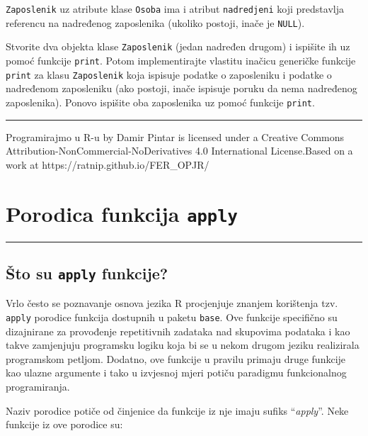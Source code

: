 \documentclass[]{book}
\theoremstyle{definition}
\theoremstyle{definition}
\theoremstyle{definition}
\theoremstyle{remark}
\begin{document}
\texttt{Zaposlenik} uz atribute klase \texttt{Osoba} ima i atribut
\texttt{nadredjeni} koji predstavlja referencu na nadređenog zaposlenika
(ukoliko postoji, inače je \texttt{NULL}).

Stvorite dva objekta klase \texttt{Zaposlenik} (jedan nadređen drugom) i
ispišite ih uz pomoć funkcije \texttt{print}. Potom implementirajte
vlastitu inačicu generičke funkcije \texttt{print} za klasu
\texttt{Zaposlenik} koja ispisuje podatke o zaposleniku i podatke o
nadređenom zaposleniku (ako postoji, inače ispisuje poruku da nema
nadređenog zaposlenika). Ponovo ispišite oba zaposlenika uz pomoć
funkcije \texttt{print}.

\begin{center}\rule{0.5\linewidth}{\linethickness}\end{center}

{Programirajmo u R-u} by Damir Pintar is licensed under a Creative
Commons Attribution-NonCommercial-NoDerivatives 4.0 International
License.Based on a work at https://ratnip.github.io/FER\_OPJR/

\chapter{\texorpdfstring{Porodica funkcija
\texttt{apply}}{Porodica funkcija apply}}\label{apply}

\begin{center}\rule{0.5\linewidth}{\linethickness}\end{center}

\section{\texorpdfstring{Što su \texttt{apply}
funkcije?}{Što su apply funkcije?}}\label{sto-su-apply-funkcije}

Vrlo često se poznavanje osnova jezika R procjenjuje znanjem korištenja
tzv. \texttt{apply} porodice funkcija dostupnih u paketu \texttt{base}.
Ove funkcije specifično su dizajnirane za provođenje repetitivnih
zadataka nad skupovima podataka i kao takve zamjenjuju programsku logiku
koja bi se u nekom drugom jeziku realizirala programskom petljom.
Dodatno, ove funkcije u pravilu primaju druge funkcije kao ulazne
argumente i tako u izvjesnoj mjeri potiču paradigmu funkcionalnog
programiranja.

Naziv porodice potiče od činjenice da funkcije iz nje imaju sufiks
``\emph{apply}''. Neke funkcije iz ove porodice su:
\end{document}
